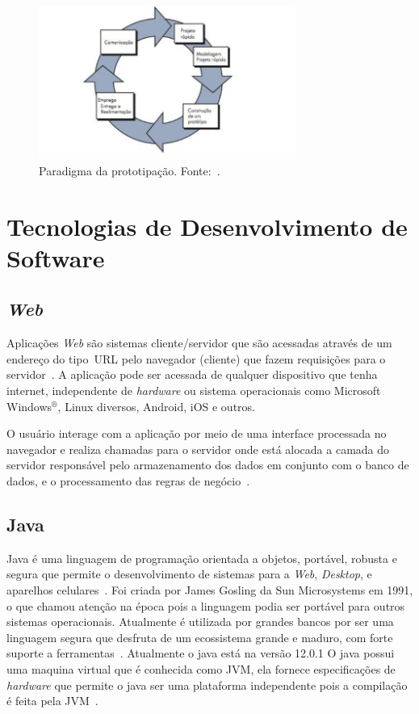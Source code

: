 \begin{figure}[htbp]
    \centering
    \includegraphics[width=0.75\textwidth]{img/paradigma_prototipacao_pressman.PNG}
    \caption[Paradigma da prototipação]{Paradigma da prototipação. Fonte:~\cite{pressmanengenharia}.}
    \label{fig:protPressman}
\end{figure}

\newpage
\section{Tecnologias de Desenvolvimento de Software}\label{TecDesSof}
\indent

\subsection{\textit{Web}}
\indent

Aplicações \textit{Web} são sistemas cliente/servidor que são acessadas através de um endereço do tipo~\acf{URL} pelo navegador (cliente) que fazem requisições para o servidor~\citep{gonccalves2007}. 
A aplicação pode ser acessada de qualquer dispositivo que tenha internet, independente de \textit{hardware} ou sistema operacionais como Microsoft Windows$^{\circledR}$, Linux diversos, Android, iOS e outros. 

O usuário interage com a aplicação por meio de uma interface processada no navegador e realiza chamadas para o servidor onde está alocada a camada do servidor responsável pelo armazenamento dos dados em conjunto com o banco de dados, e o processamento das regras de negócio~\citep{pereira2018desenvolvimento}.

\subsection{Java}\label{java}
\indent

Java é uma linguagem de programação orientada a objetos, portável, robusta e segura que permite o desenvolvimento de sistemas para a \textit{Web}, \textit{Desktop}, e aparelhos celulares~\citep{mendes2009programaccao}.
Foi criada por James Gosling da Sun Microsystems em 1991, o que chamou atenção na época pois a linguagem podia ser portável para outros sistemas operacionais. Atualmente é utilizada por grandes bancos por ser uma linguagem segura que desfruta de um ecossistema grande e maduro, com forte suporte a ferramentas~\citep{gonccalves2007}. Atualmente o java está na versão 12.0.1
O java possui uma maquina virtual que é conhecida como JVM, ela fornece especificações de \textit{hardware} que permite o java ser uma plataforma independente pois a compilação é feita pela JVM~\citep{mendes2009programaccao}.

